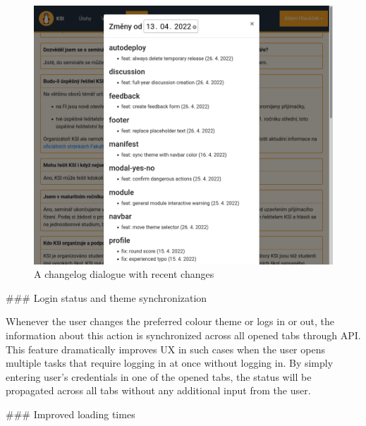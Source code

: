\documentclass[
  digital, %
  oneside, %
  lof,     %
  nolot,     %
]{fithesis4}
\begin{document}
{\begin{figure}
\includegraphics[width=\textwidth]{assets/img/changelog}
\caption{A changelog dialogue with recent changes}
\label{fig:changelog}
\end{figure}

### Login status and theme synchronization

Whenever the user changes the preferred colour theme or logs in or out, the information about this action is synchronized across all opened tabs through  API. This feature dramatically improves \acrshort{UX} in such cases when the user opens multiple tasks that require logging in at once without logging in. By simply entering user's credentials in one of the opened tabs, the status will be propagated across all tabs without any additional input from the user.

### Improved loading times
\label{chap:faster}

}
\end{document}
